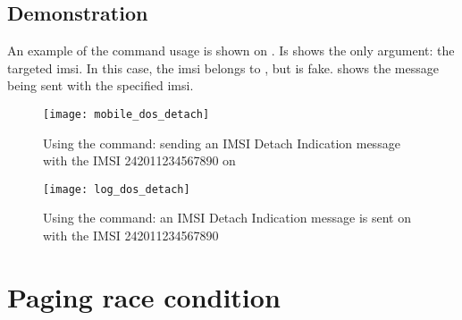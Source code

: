       \subsection{Demonstration}

      An example of the  command usage is shown on
      . Is shows the only argument: the
      targeted \gls{imsi}. In this case, the \gls{imsi} belongs to
      , but is fake.  shows
      the message being sent with the specified \gls{imsi}.

      \begin{figure}[h]
        \centering
        \texttt{[image: mobile\_dos\_detach]}
        \caption{Using the  command: sending an IMSI
        Detach Indication message with the IMSI 242011234567890 on
      }
        \label{fig:mobile_dos_detach}
      \end{figure}

      \begin{figure}[h]
        \centering
        \texttt{[image: log\_dos\_detach]}
        \caption{Using the  command: an IMSI
          Detach Indication message is sent on  with the IMSI 242011234567890}
        \label{fig:mobile_dos_detach}
      \end{figure}

      \iffalse
      \begin{figure}[h]
        \centering
        \texttt{[image: log\_dos\_detach1]}
        \caption{Using the \prog{dos detach} command: to send an IMSI
        Detach Indication message with the IMSI 242011234567890 on
      \comp{Telenor}. In Wireshark.}
        \label{fig:mobile_dos_detach1}
      \end{figure}

      \begin{figure}[h]
        \centering
        \texttt{[image: log\_dos\_detach2]}
        \caption{Can see the message being sent, and the connection being
        established. l1ctl is shown before gsm48 but sent before.}
        \label{fig:mobile_dos_detach2}
      \end{figure}
      \fi


    \section{Paging race condition}


